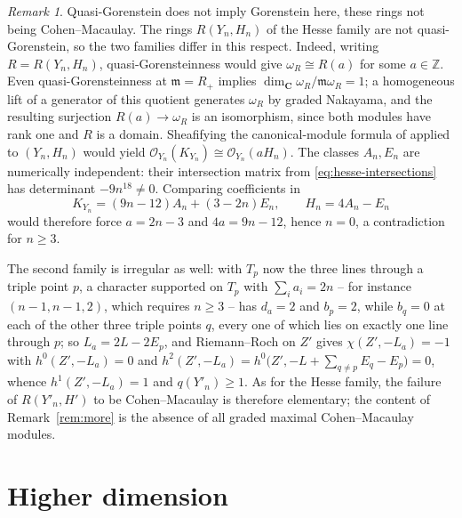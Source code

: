 \documentclass[11pt]{amsart}
\theoremstyle{remark}
\newtheorem{remark}[theorem]{Remark}
\theoremstyle{definition}
\newcommand{\ZZ}{\mathbb{Z}}
\newcommand{\CC}{\mathbf{C}}
\newcommand{\cO}{\mathcal{O}}
\begin{document}
\begin{remark}\label{rem:qgor}
Quasi-Gorenstein does not imply Gorenstein here, these rings not being Cohen--Macaulay. The rings $R(Y_n,H_n)$ of the Hesse family are not quasi-Gorenstein, so the two families differ in this respect. Indeed, writing $R=R(Y_n,H_n)$, quasi-Gorensteinness would give $\omega_R\cong R(a)$ for some $a\in\ZZ$. Even quasi-Gorensteinness at $\mathfrak m=R_+$ implies $\dim_{\CC}\omega_R/\mathfrak m\omega_R=1$; a homogeneous lift of a generator of this quotient generates $\omega_R$ by graded Nakayama, and the resulting surjection $R(a)\to\omega_R$ is an isomorphism, since both modules have rank one and $R$ is a domain. Sheafifying the canonical-module formula of \cite[(5.1.8)]{GoWa} applied to $(Y_n,H_n)$ would yield $\cO_{Y_n}(K_{Y_n})\cong\cO_{Y_n}(aH_n)$. The classes $A_n,E_n$ are numerically independent: their intersection matrix from \eqref{eq:hesse-intersections} has determinant $-9n^{18}\ne0$. Comparing coefficients in
\[
K_{Y_n}=(9n-12)A_n+(3-2n)E_n,\qquad H_n=4A_n-E_n
\]
would therefore force $a=2n-3$ and $4a=9n-12$, hence $n=0$, a contradiction for $n\ge3$.

The second family is irregular as well: with $T_p$ now the three lines through a triple point $p$, a character supported on $T_p$ with $\sum_ia_i=2n$ -- for instance $(n-1,n-1,2)$, which requires $n\ge3$ -- has $d_a=2$ and $b_p=2$, while $b_q=0$ at each of the other three triple points $q$, every one of which lies on exactly one line through $p$; so $L_a=2L-2E_p$, and Riemann--Roch on $Z'$ gives $\chi(Z',-L_a)=-1$ with $h^0(Z',-L_a)=0$ and $h^2(Z',-L_a)=h^0\bigl(Z',-L+\sum_{q\ne p}E_q-E_p\bigr)=0$, whence $h^1(Z',-L_a)=1$ and $q(Y'_n)\ge1$. As for the Hesse family, the failure of $R(Y'_n,H')$ to be Cohen--Macaulay is therefore elementary; the content of Remark~\ref{rem:more} is the absence of all graded maximal Cohen--Macaulay modules.
\end{remark}

\section{Higher dimension}\label{sec:higher}
\end{document}
